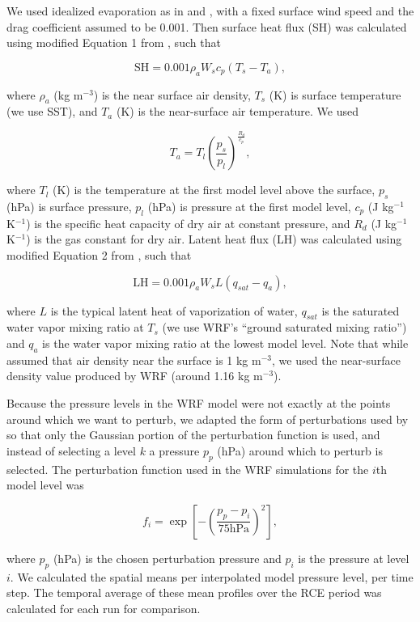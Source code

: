 \documentclass[draft]{agujournal2019}
\begin{document}
We used idealized evaporation as in  and
, with a fixed surface wind speed and the drag
coefficient assumed to be 0.001. Then surface heat flux (SH) was calculated
using modified Equation 1 from , such that

$$
\textrm{SH} = 0.001 \rho_a W_s c_p (T_s - T_a),
$$

\noindent where $\rho_a$ (kg m$^{-3}$) is the near surface air density, $T_s$
(K) is surface temperature (we use SST), and $T_a$ (K) is the near-surface air
temperature. We used 

$$
T_a = T_l \left(\frac{p_s}{p_l}\right)^{\frac{R_d}{c_p}},
$$

\noindent where $T_l$ (K) is the temperature at the first model level above the
surface, $p_s$ (hPa) is surface pressure, $p_l$ (hPa) is pressure at the first
model level, $c_p$ (J kg$^{-1}$ K$^{-1}$) is the specific heat capacity of dry
air at constant pressure, and $R_d$ (J kg$^{-1}$ K$^{-1}$) is the gas constant
for dry air. Latent heat flux (LH) was calculated using modified Equation 2 from
, such that

$$
\textrm{LH} = 0.001 \rho_a W_s L (q_{sat} - q_a),
$$

\noindent where $L$ is the typical latent heat of vaporization of water,
$q_{sat}$ is the saturated water vapor mixing ratio at $T_s$ (we use WRF's
``ground saturated mixing ratio'') and $q_a$ is the water vapor mixing ratio at
the lowest model level. Note that while  assumed that air
density near the surface is 1 kg m$^{-3}$, we used the near-surface density
value produced by WRF (around 1.16 kg m$^{-3}$).

Because the pressure levels in the WRF model were not exactly at the points
around which we want to perturb, we adapted the form of perturbations used by
 so that only the Gaussian portion of the perturbation
function is used, and instead of selecting a level $k$ a pressure $p_p$ (hPa)
around which to perturb is selected. The perturbation function used in the WRF
simulations for the $i$th model level was

$$
f_i = \exp\left[ - \left( \frac{p_p - p_i}{75 \textrm{hPa}}\right)^2 \right],
$$

\noindent where $p_p$ (hPa) is the chosen perturbation pressure and $p_i$ is the
pressure at level $i$. We calculated the spatial means per interpolated model
pressure level, per time step. The temporal average of these mean profiles over
the RCE period was calculated for each run for comparison.
\end{document}
